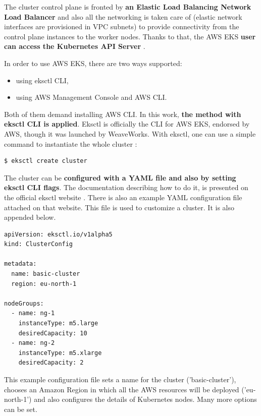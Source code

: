 The cluster control plane is fronted by \textbf{an Elastic Load Balancing Network Load Balancer} and also all the networking is taken care of (elastic network interfaces are provisioned in VPC subnets) to provide connectivity from the control plane instances to the worker nodes. Thanks to that, the AWS EKS \textbf{user can access the Kubernetes API Server} \cite{eks-clusters}.

In order to use AWS EKS, there are two ways supported:
\begin{itemize}
\item using eksctl CLI,
\item using AWS Management Console and AWS CLI.
\end{itemize}

Both of them demand installing AWS CLI. In this work, \textbf{the method with eksctl CLI is applied}. Eksctl is officially the CLI for AWS EKS, endorsed by AWS, though it was launched by WeaveWorks. With eksctl, one can use a simple command to instantiate the whole cluster \cite{eks-cli-official}:
\begin{lstlisting}[basicstyle=\small,caption={A command of eksctl CLI tool used to create a Kubernetes cluster},captionpos=b,language=Bash,xleftmargin=1cm]
$ eksctl create cluster
\end{lstlisting}

The cluster can be \textbf{configured with a YAML file and also by setting eksctl CLI flags}. The documentation describing how to do it, is presented on the official eksctl website \cite{eksctl}. There is also an example YAML configuration file attached on that website. This file is used to customize a cluster. It is also appended below.

\begin{lstlisting}[basicstyle=\tiny,caption={An example YAML file used to customize a Kubernetes cluster created with eksctl CLI tool \cite{eksctl}},captionpos=b,language=Bash,xleftmargin=1cm]
apiVersion: eksctl.io/v1alpha5
kind: ClusterConfig

metadata:
  name: basic-cluster
  region: eu-north-1

nodeGroups:
  - name: ng-1
    instanceType: m5.large
    desiredCapacity: 10
  - name: ng-2
    instanceType: m5.xlarge
    desiredCapacity: 2
\end{lstlisting}

This example configuration file sets a name for the cluster ('basic-cluster'), chooses an Amazon Region in which all the AWS resources will be deployed ('eu-north-1') and also configures the details of Kubernetes nodes. Many more options can be set.

